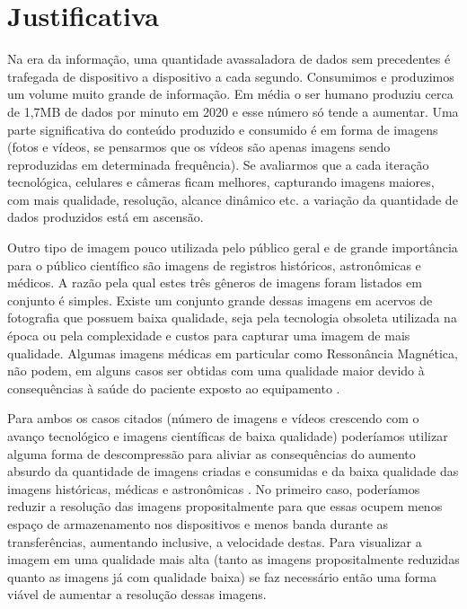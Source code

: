 \section{Justificativa}
\label{justificativa}

Na era da informação, uma quantidade avassaladora de dados sem precedentes é trafegada de dispositivo a dispositivo a cada segundo. Consumimos e produzimos um volume muito grande de informação. Em média o ser humano produziu cerca de 1,7MB de dados por minuto em 2020 \cite{vish_how_2020} e esse número só tende a aumentar. Uma parte significativa do conteúdo produzido e consumido é em forma de imagens (fotos e vídeos, se pensarmos que os vídeos são apenas imagens sendo reproduzidas em determinada frequência). Se avaliarmos que a cada iteração tecnológica, celulares e câmeras ficam melhores, capturando imagens maiores, com mais qualidade, resolução, alcance dinâmico etc. a variação da quantidade de dados produzidos está em ascensão.

Outro tipo de imagem pouco utilizada pelo público geral e de grande importância para o público científico são imagens de registros históricos, astronômicas e médicos. A razão pela qual estes três gêneros de imagens foram listados em conjunto é simples. Existe um conjunto grande dessas imagens em acervos de fotografia que possuem baixa qualidade, seja pela tecnologia obsoleta utilizada na época ou pela complexidade e custos para capturar uma imagem de mais qualidade. Algumas imagens médicas em particular como Ressonância Magnética, não podem, em alguns casos ser obtidas com uma qualidade maior devido à consequências à saúde do paciente exposto ao equipamento \cite{gupta_super-resolution_2020}.

Para ambos os casos citados (número de imagens e vídeos crescendo com o avanço tecnológico e imagens científicas de baixa qualidade) poderíamos utilizar alguma forma de descompressão para aliviar as consequências do aumento absurdo da quantidade de imagens criadas e consumidas e da baixa qualidade das imagens históricas, médicas e astronômicas \cite{sun_super_2019,noauthor_review_2020}. No primeiro caso, poderíamos reduzir a resolução das imagens propositalmente para que essas ocupem menos espaço de armazenamento nos dispositivos e menos banda durante as transferências, aumentando inclusive, a velocidade destas. Para visualizar a imagem em uma qualidade mais alta (tanto as imagens propositalmente reduzidas quanto as imagens já com qualidade baixa) se faz necessário então uma forma viável de aumentar a resolução dessas imagens. 


